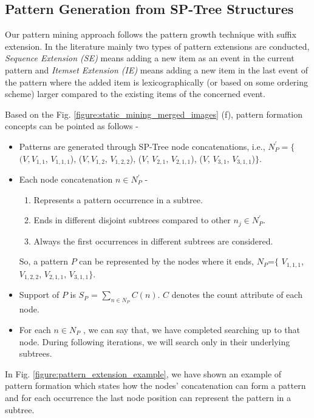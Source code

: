 \subsection{Pattern Generation from SP-Tree Structures}
Our pattern mining approach follows the pattern growth technique with suffix extension. In the literature mainly two types of pattern extensions are conducted, \textit{Sequence Extension (SE)} means adding a new item as an event in the current pattern and \textit{Itemset Extension (IE)} means adding a new item in the last event of the pattern where the added item is lexicographically (or based on some ordering scheme) larger compared to the existing items of the concerned event. 
\begin{definition} \label{defintion:pattern_formation}
     Based on the Fig. \ref{figure:static_mining_merged_images} (f), pattern formation concepts can be pointed as follows -
    \begin{itemize}
        \item Patterns are generated through SP-Tree node concatenations,
i.e., $N_{P}^{\prime}=\{$ $(V, V_{1,1}$, $V_{1,1,1}$), ($V, V_{1,2}$, $V_{1,2,2}$),  ($V$, $V_{2,1}$, $V_{2,1,1}$), ($V$, $V_{3,1}$, $V_{3,1,1}$)$\}$.
    \item Each node concatenation $n  \in  N_{P}^{\prime}$ -  
        \begin{enumerate}
            \item Represents a pattern occurrence in a subtree.
            \item Ends in different disjoint subtrees compared to other $n_{j}  \in N_{P}^{\prime}$.
            \item Always the first occurrences in different subtrees are considered. 
        \end{enumerate}
         So, a pattern $P$ can be represented by the nodes where it ends,  $N_{P}$=$\{$ $V_{1,1,1}$,  $V_{1,2,2}$,  $V_{2,1,1}$,   $V_{3,1,1}\}$.
    \item Support of $P$ is $S_{P}$ =  $\sum_{n \in N_{P}} C(n)$. $C$ denotes the count attribute of each node.  
    \item For each $n \in N_{P}$ , we can say that, we have completed searching up to that node. During following iterations, we will search only in their underlying subtrees.  
    \end{itemize}
\end{definition}

In Fig. \ref{figure:pattern_extension_example}, we have shown an example of pattern formation which states how the nodes' concatenation can form a pattern and for each occurrence the last node position can represent the pattern in a subtree. 

